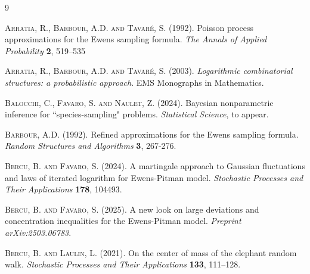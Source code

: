 \documentclass[twoside,12pt]{article}
\begin{document}
\begin{thebibliography}{9}

\textsc{Arratia, R., Barbour, A.D. and Tavar\'e, S.} (1992). Poisson process approximations for the Ewens sampling formula. \textit{The Annals of Applied Probability} \textbf{2}, 519--535

\textsc{Arratia, R., Barbour, A.D. and Tavar\'e, S.} (2003). \textit{Logarithmic combinatorial structures: a probabilistic approach}. EMS Monographs in Mathematics.

\textsc{Balocchi, C., Favaro, S. and Naulet, Z.} (2024). Bayesian nonparametric inference for ``species-sampling" problems. \textit{Statistical Science}, to appear.

\textsc{Barbour, A.D.} (1992). Refined approximations for the Ewens sampling formula. \textit{Random Structures and Algorithms} \textbf{3}, 267-276.


\textsc{Bercu, B. and Favaro, S.} (2024). A martingale approach to Gaussian fluctuations and laws of iterated logarithm for Ewens-Pitman model. \textit{Stochastic Processes and Their Applications} \textbf{178}, 104493.

\textsc{Bercu, B. and Favaro, S.} (2025). A new look on large deviations and concentration inequalities for the Ewens-Pitman model. \textit{Preprint arXiv:2503.06783}.

\textsc{Bercu, B. and Laulin, L.} (2021). On the center of mass of the elephant random walk. \textit{Stochastic Processes and Their Applications} \textbf{133}, 111--128.




\end{thebibliography}
\end{document}
